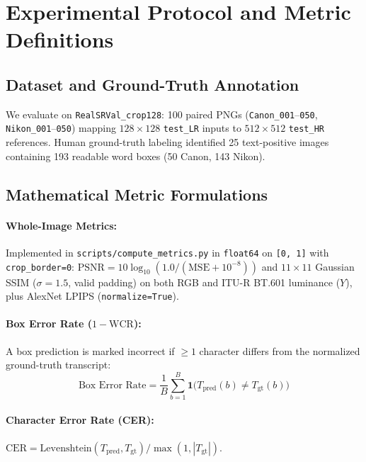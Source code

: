 \documentclass[11pt]{article}
\begin{document}
\section{Experimental Protocol and Metric Definitions}
\subsection{Dataset and Ground-Truth Annotation}
We evaluate on \texttt{RealSRVal\_crop128}: 100 paired PNGs (\texttt{Canon\_001}--\texttt{050}, \texttt{Nikon\_001}--\texttt{050}) mapping $128\times 128$ \texttt{test\_LR} inputs to $512\times 512$ \texttt{test\_HR} references. Human ground-truth labeling identified 25 text-positive images containing 193 readable word boxes (50 Canon, 143 Nikon).

\subsection{Mathematical Metric Formulations}
\paragraph{Whole-Image Metrics:} Implemented in \texttt{scripts/compute\_metrics.py} in \texttt{float64} on \texttt{[0, 1]} with \texttt{crop\_border=0}: $\text{PSNR} = 10\log_{10}(1.0/(\text{MSE}+10^{-8}))$ and $11\times 11$ Gaussian SSIM ($\sigma=1.5$, valid padding) on both RGB and ITU-R BT.601 luminance ($Y$), plus AlexNet LPIPS (\texttt{normalize=True}).
\paragraph{Box Error Rate ($1-\text{WCR}$):} A box prediction is marked incorrect if $\ge 1$ character differs from the normalized ground-truth transcript:
\begin{equation}
\text{Box Error Rate} = \frac{1}{B} \sum_{b=1}^B \mathbf{1}\bigl(T_{\text{pred}}(b) \ne T_{\text{gt}}(b)\bigr)
\end{equation}
\paragraph{Character Error Rate (CER):} $\text{CER} = \text{Levenshtein}(T_{\text{pred}}, T_{\text{gt}}) / \max(1, |T_{\text{gt}}|)$.
\end{document}
